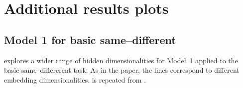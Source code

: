 \newpage


\section{Additional results plots}


\subsection{Model 1 for basic same--different}\label{app:model1-results}

 explores a wider range of hidden dimensionalities for Model~1 applied to the basic same--differerent task. As in the paper, the lines correspond to different embedding dimensionalities.  is repeated from .

